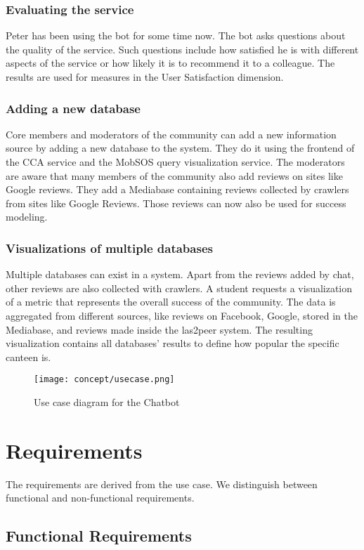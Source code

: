 \subsubsection{Evaluating the service} 
Peter has been using the bot for some time now. The bot asks questions about the quality of the service. Such questions include how satisfied he is with different aspects of the service or how likely it is to recommend it to a colleague. The results are used for measures in the User Satisfaction dimension.

\subsubsection{Adding a new database} 
Core members and moderators of the community can add a new information source by adding a new database to the system. They do it using the frontend of the CCA service and the MobSOS query visualization service.
The moderators are aware that many members of the community also add reviews on sites like Google reviews. 
They add a Mediabase containing reviews collected by crawlers from sites like Google Reviews. Those reviews can now also be used for success modeling.

\subsubsection{Visualizations of multiple databases} 
Multiple databases can exist in a system. Apart from the reviews added by chat, other reviews are also collected with crawlers. A student requests a visualization of a metric that represents the overall success of the community.
The data is aggregated from different sources, like reviews on Facebook, Google, stored in the Mediabase, and reviews made inside the las2peer system. 
The resulting visualization contains all databases' results to define how popular the specific canteen is.

\begin{figure}
    \centering
    \texttt{[image: concept/usecase.png]}
    \caption{Use case diagram for the Chatbot}
\end{figure}

\section{Requirements}
The requirements are derived from the use case. We distinguish between functional and non-functional requirements.
\subsection{Functional Requirements}

